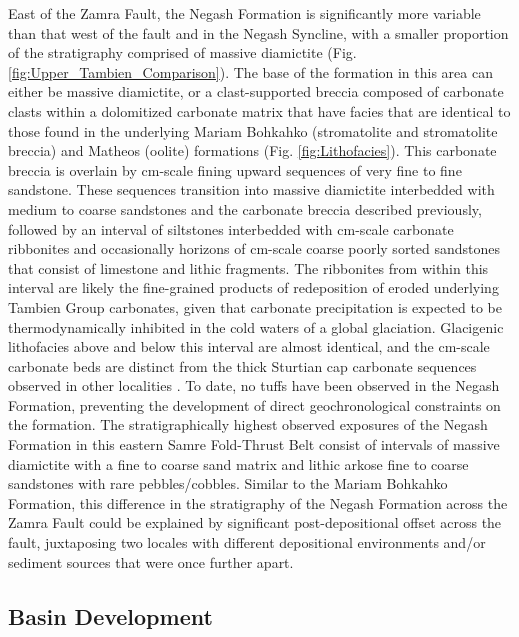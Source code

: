 \documentclass[11pt,letterpaper]{article}
\begin{document}
East of the Zamra Fault, the Negash Formation is significantly more variable than that west of the fault and in the Negash Syncline, with a smaller proportion of the stratigraphy comprised of massive diamictite (Fig. \ref{fig:Upper_Tambien_Comparison}). The base of the formation in this area can either be massive diamictite, or a clast-supported breccia composed of carbonate clasts within a dolomitized carbonate matrix that have facies that are identical to those found in the underlying Mariam Bohkahko (stromatolite and stromatolite breccia) and Matheos (oolite) formations (Fig. \ref{fig:Lithofacies}). This carbonate breccia is overlain by cm-scale fining upward sequences of very fine to fine sandstone. These sequences transition into massive diamictite interbedded with medium to coarse sandstones and the carbonate breccia described previously, followed by an interval of siltstones interbedded with cm-scale carbonate ribbonites and occasionally horizons of cm-scale coarse poorly sorted sandstones that consist of limestone and lithic fragments. The ribbonites from within this interval are likely the fine-grained products of redeposition of eroded underlying Tambien Group carbonates, given that carbonate precipitation is expected to be thermodynamically inhibited in the cold waters of a global glaciation. Glacigenic lithofacies above and below this interval are almost identical, and the cm-scale carbonate beds are distinct from the thick Sturtian cap carbonate sequences observed in other localities \citep{Kennedy1998a, Hoffman2011a}. To date, no tuffs have been observed in the Negash Formation, preventing the development of direct geochronological constraints on the formation. The stratigraphically highest observed exposures of the Negash Formation in this eastern Samre Fold-Thrust Belt consist of intervals of massive diamictite with a fine to coarse sand matrix and lithic arkose fine to coarse sandstones with rare pebbles/cobbles. Similar to the Mariam Bohkahko Formation, this difference in the stratigraphy of the Negash Formation across the Zamra Fault could be explained by significant post-depositional offset across the fault, juxtaposing two locales with different depositional environments and/or sediment sources that were once further apart.

\subsection*{Basin Development \label{sec:BasinDevelopment}}
\end{document}
